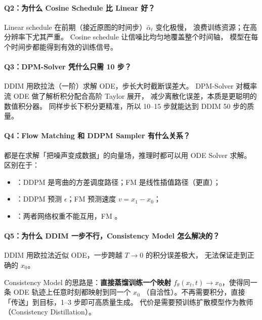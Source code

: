 \paragraph{Q2：为什么 Cosine Schedule 比 Linear 好？}

\begin{conceptbox}
Linear schedule 在前期（接近原图的时间步）$\bar\alpha_t$ 变化极慢，
浪费训练资源；在高分辨率下尤其严重。
Cosine schedule 让信噪比均匀地覆盖整个时间轴，
模型在每个时间步都能得到有效的训练信号。
\end{conceptbox}

\paragraph{Q3：DPM-Solver 凭什么只需 10 步？}

\begin{conceptbox}
DDIM 用欧拉法（一阶）求解 ODE，步长大时截断误差大。
DPM-Solver 对概率流 ODE 做了解析积分配合高阶 Taylor 展开，
减少离散化误差，本质是更聪明的数值积分器。
同样步长下积分更精准，所以 10--15 步就能达到 DDIM 50 步的质量。
\end{conceptbox}

\paragraph{Q4：Flow Matching 和 DDPM Sampler 有什么关系？}

\begin{conceptbox}
都是在求解「把噪声变成数据」的向量场，推理时都可以用 ODE Solver 求解。
区别在于：
\begin{itemize}
  \item {}：DDPM 是弯曲的方差调度路径；FM 是线性插值路径（更直）；
  \item {}：DDPM 预测 $\epsilon$；FM 预测速度 $v = x_1 - x_0$；
  \item {}：两者网络权重不能互用，FM 。
\end{itemize}
\end{conceptbox}

\paragraph{Q5：为什么 DDIM 一步不行，Consistency Model 怎么解决的？}

\begin{conceptbox}
DDIM 用欧拉法近似 ODE，一步跨越 $T \to 0$ 的积分误差极大，
无法保证走到正确的 $x_0$。

Consistency Model 的思路是：\textbf{直接蒸馏训练一个映射}
$f_\theta(x_t, t) \to x_0$，使得同一条 ODE 轨迹上任意时刻都映射到同一个 $x_0$
（自洽性）。不再需要积分，直接「传送」到目标，1--3 步即可高质量生成。
代价是需要预训练扩散模型作为教师（Consistency Distillation）。
\end{conceptbox}

